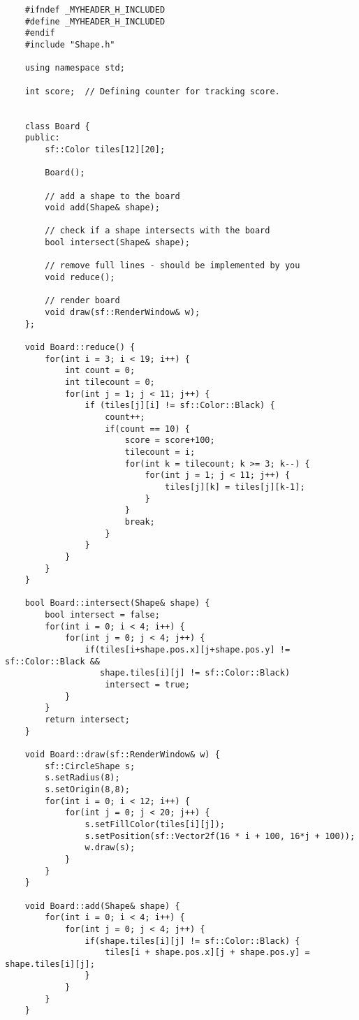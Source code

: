 \documentclass[11pt]{amsart}
\begin{document}
\begin{verbatim}
	#ifndef _MYHEADER_H_INCLUDED
	#define _MYHEADER_H_INCLUDED
	#endif
	#include "Shape.h"

	using namespace std;

	int score;  // Defining counter for tracking score.


	class Board {
	public:
	    sf::Color tiles[12][20];

	    Board();

	    // add a shape to the board
	    void add(Shape& shape);

	    // check if a shape intersects with the board
	    bool intersect(Shape& shape);

	    // remove full lines - should be implemented by you
	    void reduce();

	    // render board
	    void draw(sf::RenderWindow& w);
	};

	void Board::reduce() {
	    for(int i = 3; i < 19; i++) {
	        int count = 0;
	        int tilecount = 0;
	        for(int j = 1; j < 11; j++) {
	            if (tiles[j][i] != sf::Color::Black) {
	                count++;
	                if(count == 10) {
	                    score = score+100;
	                    tilecount = i;
	                    for(int k = tilecount; k >= 3; k--) {
	                        for(int j = 1; j < 11; j++) {
	                            tiles[j][k] = tiles[j][k-1];
	                        }
	                    }
	                    break;
	                }
	            }
	        }
	    }
	}

	bool Board::intersect(Shape& shape) {
	    bool intersect = false;
	    for(int i = 0; i < 4; i++) {
	        for(int j = 0; j < 4; j++) {
	            if(tiles[i+shape.pos.x][j+shape.pos.y] != sf::Color::Black &&
	               shape.tiles[i][j] != sf::Color::Black)
	                intersect = true;
	        }
	    }
	    return intersect;
	}

	void Board::draw(sf::RenderWindow& w) {
	    sf::CircleShape s;
	    s.setRadius(8);
	    s.setOrigin(8,8);
	    for(int i = 0; i < 12; i++) {
	        for(int j = 0; j < 20; j++) {
	            s.setFillColor(tiles[i][j]);
	            s.setPosition(sf::Vector2f(16 * i + 100, 16*j + 100));
	            w.draw(s);
	        }
	    }
	}

	void Board::add(Shape& shape) {
	    for(int i = 0; i < 4; i++) {
	        for(int j = 0; j < 4; j++) {
	            if(shape.tiles[i][j] != sf::Color::Black) {
	                tiles[i + shape.pos.x][j + shape.pos.y] = shape.tiles[i][j];
	            }
	        }
	    }
	}


\end{verbatim}
\end{document}

